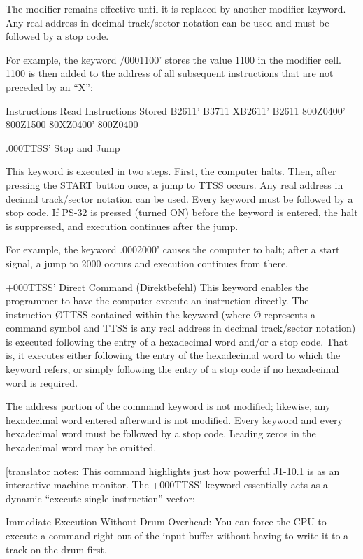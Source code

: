\documentclass{article}
\begin{document}
\begin{enumerate}
The modifier remains effective until it is replaced by another modifier keyword. Any real address in decimal track/sector notation can be used and must be followed by a stop code.

For example, the keyword /0001100' stores the value 1100 in the modifier cell. 1100 is then added to the address of all subsequent instructions that are not preceded by an ``X'':

Instructions Read   Instructions Stored
B2611'              B3711
XB2611'             B2611
800Z0400'           800Z1500
80XZ0400'           800Z0400


.000TTSS' Stop and Jump

This keyword is executed in two steps. First, the computer halts. Then, after pressing the START button once, a jump to TTSS occurs. Any real address in decimal track/sector notation can be used. Every keyword must be followed by a stop code. If PS-32 is pressed (turned ON) before the keyword is entered, the halt is suppressed, and execution continues after the jump.

For example, the keyword .0002000' causes the computer to halt; after a start signal, a jump to 2000 occurs and execution continues from there.

+000TTSS' Direct Command (Direktbefehl)
This keyword enables the programmer to have the computer execute an instruction directly. The instruction ØTTSS contained within the keyword (where Ø represents a command symbol and TTSS is any real address in decimal track/sector notation) is executed following the entry of a hexadecimal word and/or a stop code. That is, it executes either following the entry of the hexadecimal word to which the keyword refers, or simply following the entry of a stop code if no hexadecimal word is required.

The address portion of the command keyword is not modified; likewise, any hexadecimal word entered afterward is not modified. Every keyword and every hexadecimal word must be followed by a stop code. Leading zeros in the hexadecimal word may be omitted.

[translator notes: This command highlights just how powerful J1-10.1 is as an interactive machine monitor. The +000TTSS' keyword essentially acts as a dynamic ``execute single instruction'' vector:

Immediate Execution Without Drum Overhead: You can force the CPU to execute a command right out of the input buffer without having to write it to a track on the drum first.


\end{enumerate}
\end{document}
